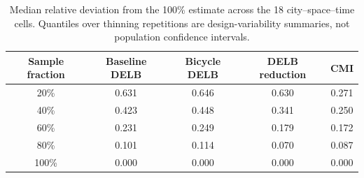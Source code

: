 \begin{table}[!htbp]
\caption{Median relative deviation from the 100\% estimate across the 18 city--space--time cells. Quantiles over thinning repetitions are design-variability summaries, not population confidence intervals.}
\label{tab:e16_sample_stability}
\begin{tabular*}{\linewidth}{@{\extracolsep{\fill}}ccccc@{}}
\toprule
\textbf{Sample fraction} & \textbf{Baseline DELB} & \textbf{Bicycle DELB} & \textbf{DELB reduction} & \textbf{CMI}\\
\midrule
20\% & 0.631 & 0.646 & 0.630 & 0.271\\
40\% & 0.423 & 0.448 & 0.341 & 0.250\\
60\% & 0.231 & 0.249 & 0.179 & 0.172\\
80\% & 0.101 & 0.114 & 0.070 & 0.087\\
100\% & 0.000 & 0.000 & 0.000 & 0.000\\
\bottomrule
\end{tabular*}
\end{table}
